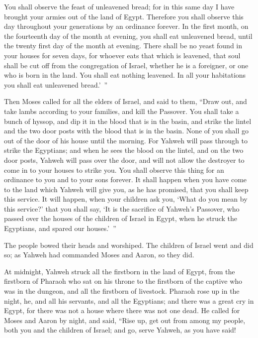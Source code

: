 {You shall observe the feast of unleavened bread; for in this same day I have brought your armies out of the land of Egypt. Therefore you shall observe this day throughout your generations by an ordinance forever.
In the first month, on the fourteenth day of the month at evening, you shall eat unleavened bread, until the twenty first day of the month at evening.
There shall be no yeast found in your houses for seven days, for whoever eats that which is leavened, that soul shall be cut off from the congregation of Israel, whether he is a foreigner, or one who is born in the land.
You shall eat nothing leavened. In all your habitations you shall eat unleavened bread.’ ”
\par }{\PP {}Then Moses called for all the elders of Israel, and said to them, “Draw out, and take lambs according to your families, and kill the Passover.
You shall take a bunch of hyssop, and dip it in the blood that is in the basin, and strike the lintel and the two door posts with the blood that is in the basin. None of you shall go out of the door of his house until the morning.
For Yahweh will pass through to strike the Egyptians; and when he sees the blood on the lintel, and on the two door posts, Yahweh will pass over the door, and will not allow the destroyer to come in to your houses to strike you.
You shall observe this thing for an ordinance to you and to your sons forever.
It shall happen when you have come to the land which Yahweh will give you, as he has promised, that you shall keep this service.
It will happen, when your children ask you, ‘What do you mean by this service?’
that you shall say, ‘It is the sacrifice of Yahweh’s Passover, who passed over the houses of the children of Israel in Egypt, when he struck the Egyptians, and spared our houses.’ ”
\par }{\PP The people bowed their heads and worshiped.
The children of Israel went and did so; as Yahweh had commanded Moses and Aaron, so they did.
\par }{\PP {}At midnight, Yahweh struck all the firstborn in the land of Egypt, from the firstborn of Pharaoh who sat on his throne to the firstborn of the captive who was in the dungeon, and all the firstborn of livestock.
Pharaoh rose up in the night, he, and all his servants, and all the Egyptians; and there was a great cry in Egypt, for there was not a house where there was not one dead.
He called for Moses and Aaron by night, and said, “Rise up, get out from among my people, both you and the children of Israel; and go, serve Yahweh, as you have said!
}
